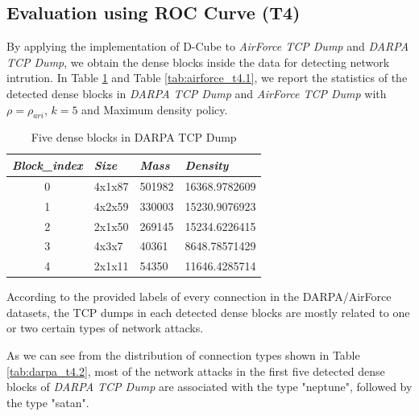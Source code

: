 \eit


\subsection{Evaluation using ROC Curve (T4)}

By applying the implementation of D-Cube to \textit{AirForce TCP Dump} and \textit{DARPA TCP Dump}, we obtain the dense blocks inside the data for detecting network intrution. In Table \ref{tab:darpa_t4.1} and Table \ref{tab:airforce_t4.1}, we report the statistics of the detected dense blocks in \textit{DARPA TCP Dump} and \textit{AirForce TCP Dump} with $\rho=\rho_{ari}$, $k=5$ and Maximum density policy.  

\renewcommand{\arraystretch}{1.2}
\begin{table}[!ht]
\centering
\caption{Five dense blocks in DARPA TCP Dump}
\label{tab:darpa_t4.1}
\begin{tabular}{|c|p{2cm}|p{2cm}|p{3cm}|}
\hline
\textit{\textbf{Block\_index}} & \textit{\textbf{Size}} & \textit{\textbf{Mass}} & \textit{\textbf{Density}} \\ \hline
{0}      & 4x1x87     & 501982       & 16368.9782609                            \\ \hline
{1}      & 4x2x59     & 330003       & 15230.9076923                            \\ \hline
{2}      & 2x1x50     & 269145       & 15234.6226415                           \\ \hline
{3}      & 4x3x7      & 40361        & 8648.78571429                           \\ \hline
{4}      & 2x1x11     & 54350        & 11646.4285714                           \\ \hline
\end{tabular}
\end{table}

According to the provided labels of every connection in the DARPA/AirForce datasets, the TCP dumps in each detected dense blocks are mostly related to one or two certain types of network attacks. 

As we can see from the distribution of connection types shown in Table \ref{tab:darpa_t4.2}, most of the network attacks in the first five detected dense blocks of \textit{DARPA TCP Dump} are associated with the type "neptune", followed by the type "satan". 


